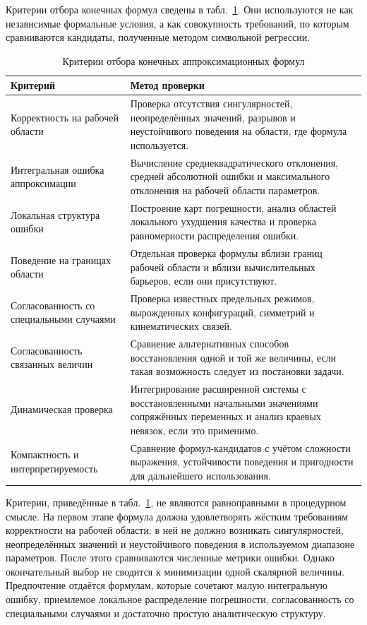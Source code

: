 Критерии отбора конечных формул сведены в табл.~\ref{tab:approx_criteria}. Они используются не как независимые формальные условия, а как совокупность требований, по которым сравниваются кандидаты, полученные методом символьной регрессии.

\begin{table}[htbp]
	\centering
	\caption{Критерии отбора конечных аппроксимационных формул}
	\label{tab:approx_criteria}
	\begin{tabular}{p{}p{}}
		\toprule
		Критерий & Метод проверки \\
		\midrule
		Корректность на рабочей области &
		Проверка отсутствия сингулярностей, неопределённых значений, разрывов и неустойчивого поведения на области, где формула используется. \\
		Интегральная ошибка аппроксимации &
		Вычисление среднеквадратического отклонения, средней абсолютной ошибки и максимального отклонения на рабочей области параметров. \\
		Локальная структура ошибки &
		Построение карт погрешности, анализ областей локального ухудшения качества и проверка равномерности распределения ошибки. \\
		Поведение на границах области &
		Отдельная проверка формулы вблизи границ рабочей области и вблизи вычислительных барьеров, если они присутствуют. \\
		Согласованность со специальными случаями &
		Проверка известных предельных режимов, вырожденных конфигураций, симметрий и кинематических связей. \\
		Согласованность связанных величин &
		Сравнение альтернативных способов восстановления одной и той же величины, если такая возможность следует из постановки задачи. \\
		Динамическая проверка &
		Интегрирование расширенной системы с восстановленными начальными значениями сопряжённых переменных и анализ краевых невязок, если это применимо. \\
		Компактность и интерпретируемость &
		Сравнение формул-кандидатов с учётом сложности выражения, устойчивости поведения и пригодности для дальнейшего использования. \\
		\bottomrule
	\end{tabular}
\end{table}

Критерии, приведённые в табл.~\ref{tab:approx_criteria}, не являются равноправными в процедурном смысле. На первом этапе формула должна удовлетворять жёстким требованиям корректности на рабочей области: в ней не должно возникать сингулярностей, неопределённых значений и неустойчивого поведения в используемом диапазоне параметров. После этого сравниваются численные метрики ошибки. Однако окончательный выбор не сводится к минимизации одной скалярной величины. Предпочтение отдаётся формулам, которые сочетают малую интегральную ошибку, приемлемое локальное распределение погрешности, согласованность со специальными случаями и достаточно простую аналитическую структуру.

